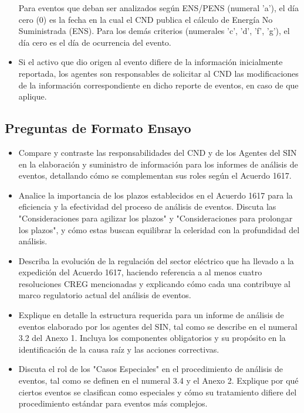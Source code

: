 \documentclass[a5paper]{book}%
\begin{document}
\begin{itemize}
	Para eventos que deban ser analizados según ENS/PENS (numeral 'a'), el día cero (0) es la fecha en la cual el CND publica el cálculo de Energía No Suministrada (ENS). Para los demás criterios (numerales 'c', 'd', 'f', 'g'), el día cero es el día de ocurrencia del evento.
	\item Si el activo que dio origen al evento difiere de la información inicialmente reportada, los agentes son responsables de solicitar al CND las modificaciones de la información correspondiente en dicho reporte de eventos, en caso de que aplique.
\end{itemize}

\subsection{Preguntas de Formato Ensayo}
\begin{itemize}
	\item Compare y contraste las responsabilidades del CND y de los Agentes del SIN en la elaboración y suministro de información para los informes de análisis de eventos, detallando cómo se complementan sus roles según el Acuerdo 1617.
	
	\item  Analice la importancia de los plazos establecidos en el Acuerdo 1617 para la eficiencia y la efectividad del proceso de análisis de eventos. Discuta las "Consideraciones para agilizar los plazos" y "Consideraciones para prolongar los plazos", y cómo estas buscan equilibrar la celeridad con la profundidad del análisis.
	
	\item Describa la evolución de la regulación del sector eléctrico que ha llevado a la expedición del Acuerdo 1617, haciendo referencia a al menos cuatro resoluciones CREG mencionadas y explicando cómo cada una contribuye al marco regulatorio actual del análisis de eventos.
	\item Explique en detalle la estructura requerida para un informe de análisis de eventos elaborado por los agentes del SIN, tal como se describe en el numeral 3.2 del Anexo 1. Incluya los componentes obligatorios y su propósito en la identificación de la causa raíz y las acciones correctivas.
	\item Discuta el rol de los "Casos Especiales" en el procedimiento de análisis de eventos, tal como se definen en el numeral 3.4 y el Anexo 2. Explique por qué ciertos eventos se clasifican como especiales y cómo su tratamiento difiere del procedimiento estándar para eventos más complejos.
\end{itemize}
\end{document}
